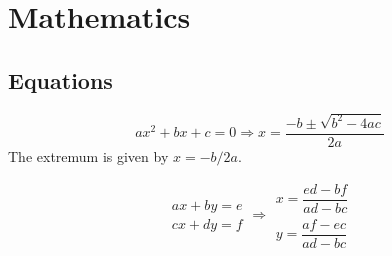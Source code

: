 

\chapter{Mathematics}

\section{Equations}
\[ax^2+bx+c=0 \Rightarrow x = \frac{-b\pm\sqrt{b^2-4ac}}{2a}\]
The extremum is given by $x = -b/2a$.

\[\begin{aligned}ax+by=e\\cx+dy=f\end{aligned}
\Rightarrow
\begin{aligned}x=\dfrac{ed-bf}{ad-bc}\\y=\dfrac{af-ec}{ad-bc}\end{aligned}\]

